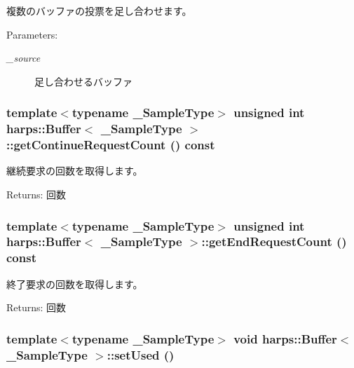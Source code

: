 複数のバッファの投票を足し合わせます。 \begin{Desc}
\item[Parameters:]
\begin{description}
\item[{\em \_\-source}]足し合わせるバッファ \end{description}
\end{Desc}
\subsubsection[getContinueRequestCount]{\setlength{\rightskip}{0pt plus 5cm}template$<$typename \_\-SampleType$>$ unsigned int {\bf harps::Buffer}$<$ \_\-SampleType $>$::getContinueRequestCount () const\hspace{0.3cm}{\tt  [inline]}}\label{classharps_1_1Buffer_f102d36b2f325b5d22fa91b7dfb6d7ba}


継続要求の回数を取得します。 \begin{Desc}
\item[Returns:]回数 \end{Desc}
\subsubsection[getEndRequestCount]{\setlength{\rightskip}{0pt plus 5cm}template$<$typename \_\-SampleType$>$ unsigned int {\bf harps::Buffer}$<$ \_\-SampleType $>$::getEndRequestCount () const\hspace{0.3cm}{\tt  [inline]}}\label{classharps_1_1Buffer_588439f2fb486c1ceef8f3e2700e1110}


終了要求の回数を取得します。 \begin{Desc}
\item[Returns:]回数 \end{Desc}
\subsubsection[setUsed]{\setlength{\rightskip}{0pt plus 5cm}template$<$typename \_\-SampleType$>$ void {\bf harps::Buffer}$<$ \_\-SampleType $>$::setUsed ()\hspace{0.3cm}{\tt  [inline]}}\label{classharps_1_1Buffer_cb84b61718acf55369f9d896db08649b}


